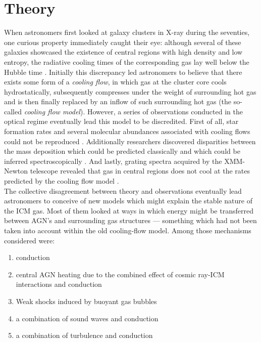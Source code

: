 \documentclass[twoside,single]{lion-msc}
\begin{document}
    
    
\chapter{Theory}    
    
     When astronomers first looked at galaxy clusters in X-ray during the seventies, one curious property immediately caught their eye: although several of these galaxies showcased the existence of central regions with high density and low entropy, the radiative cooling times of the corresponding gas lay well below the Hubble time \citep{Fabian1977, Lea1973, Cowie1977, Mathews1978}. Initially this discrepancy led astronomers to believe that there exists some form of a \textit{cooling flow}, in which gas at the cluster core cools hydrostatically, subsequently compresses under the weight of surrounding hot gas and is then finally replaced by an inflow of such surrounding hot gas (the so-called \textit{cooling flow model}). However, a series of observations conducted in the optical regime eventually lead this model to be discredited. First of all, star formation rates and several molecular abundances associated with cooling flows could not be reproduced \citep{McNamara1989, Edge2001}. Additionally researchers discovered disparities between the mass deposition which could be predicted classically and which could be inferred spectroscopically \citep{Makishima2001}. And lastly, grating spectra acquired by the XMM-Newton telescope revealed that gas in central regions does not cool at the rates predicted by the cooling flow model \citep{Peterson2001, Peterson2003, Tamura2001, Xu2002}. \\
    
    The collective disagreement between theory and observations eventually lead astronomers to conceive of new models which might explain the stable nature of the ICM gas. Most of them looked at ways in which energy might be transferred between AGN's and surrounding gas structures --- something which had not been taken into account within the old cooling-flow model. Among those mechanisms considered were:

    \begin{enumerate}
            \item conduction \citep{Zakamska2002}
            \item central AGN heating due to the combined effect of cosmic ray-ICM interactions and conduction \citep{Guo2007}
            \item Weak shocks induced by buoyant gas bubbles \citep{Mathews2005}
            \item a combination of sound waves and conduction \citep{Ruszkowski2003}
            \item a combination of turbulence and conduction \citep{Dennis2006}
        \end{enumerate}
     
\end{document}
